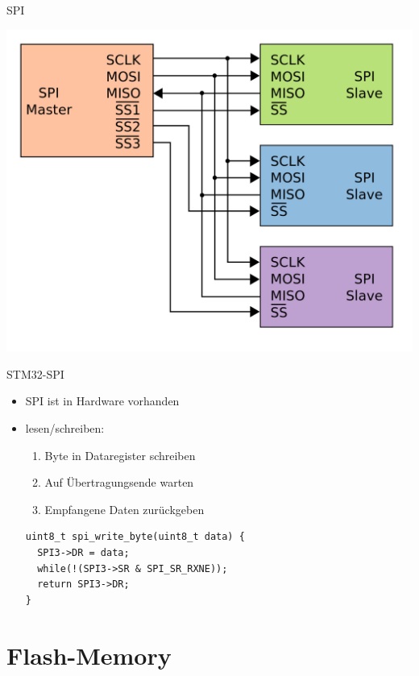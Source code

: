   \begin{frame} {SPI}
    \begin{center}
      \includegraphics[height=.8\textheight]{figs/SPI-parallel}    
    \end{center}
  \end{frame}

  \begin{frame} [fragile] {STM32-SPI}
    \begin{itemize}
      \item SPI ist in Hardware vorhanden
      \item lesen/schreiben:
      \begin{enumerate}
        \item Byte in Dataregister schreiben
        \item Auf Übertragungsende warten
        \item Empfangene Daten zurückgeben
      \end{enumerate}
      \begin{lstlisting}
uint8_t spi_write_byte(uint8_t data) {
  SPI3->DR = data;
  while(!(SPI3->SR & SPI_SR_RXNE)); 
  return SPI3->DR;
}
        \end{lstlisting}
    \end{itemize}
  \end{frame}


  \section{Flash-Memory}


